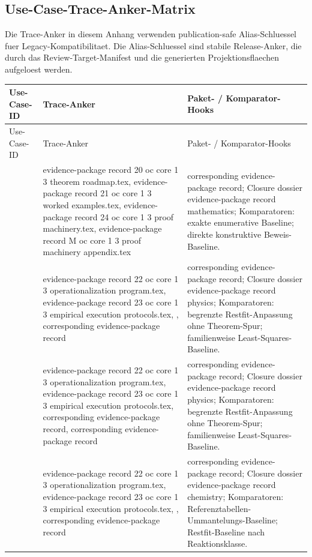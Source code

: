 \subsection{Use-Case-Trace-Anker-Matrix}
Die Trace-Anker in diesem Anhang verwenden publication-safe Alias-Schluessel fuer Legacy-Kompatibilitaet. Die Alias-Schluessel sind stabile Release-Anker, die durch das Review-Target-Manifest und die generierten Projektionsflaechen aufgeloest werden.
\begin{longtable}{@{}L{0.16\textwidth}L{0.38\textwidth}L{0.34\textwidth}@{}}
\toprule
Use-Case-ID & Trace-Anker & Paket- / Komparator-Hooks \\
\midrule
\endfirsthead
\toprule
Use-Case-ID & Trace-Anker & Paket- / Komparator-Hooks \\
\midrule
\endhead
{} & evidence-package record 20 oc core 1 3 theorem roadmap.tex, \allowbreak evidence-package record 21 oc core 1 3 worked examples.tex, \allowbreak evidence-package record 24 oc core 1 3 proof machinery.tex, \allowbreak evidence-package record M oc core 1 3 proof machinery appendix.tex & corresponding evidence-package record; Closure dossier evidence-package record mathematics; Komparatoren: exakte enumerative Baseline; direkte konstruktive Beweis-Baseline. \\
 & evidence-package record 22 oc core 1 3 operationalization program.tex, \allowbreak evidence-package record 23 oc core 1 3 empirical execution protocols.tex, \allowbreak {}, corresponding evidence-package record & corresponding evidence-package record; Closure dossier evidence-package record physics; Komparatoren: begrenzte Restfit-Anpassung ohne Theorem-Spur; familienweise Least-Squares-Baseline. \\
 & evidence-package record 22 oc core 1 3 operationalization program.tex, \allowbreak evidence-package record 23 oc core 1 3 empirical execution protocols.tex, corresponding evidence-package record, corresponding evidence-package record & corresponding evidence-package record; Closure dossier evidence-package record physics; Komparatoren: begrenzte Restfit-Anpassung ohne Theorem-Spur; familienweise Least-Squares-Baseline. \\
 & evidence-package record 22 oc core 1 3 operationalization program.tex, \allowbreak evidence-package record 23 oc core 1 3 empirical execution protocols.tex, \allowbreak {}, corresponding evidence-package record & corresponding evidence-package record; Closure dossier evidence-package record chemistry; Komparatoren: Referenztabellen-Ummantelungs-Baseline; Restfit-Baseline nach Reaktionsklasse. \\

\end{longtable}
